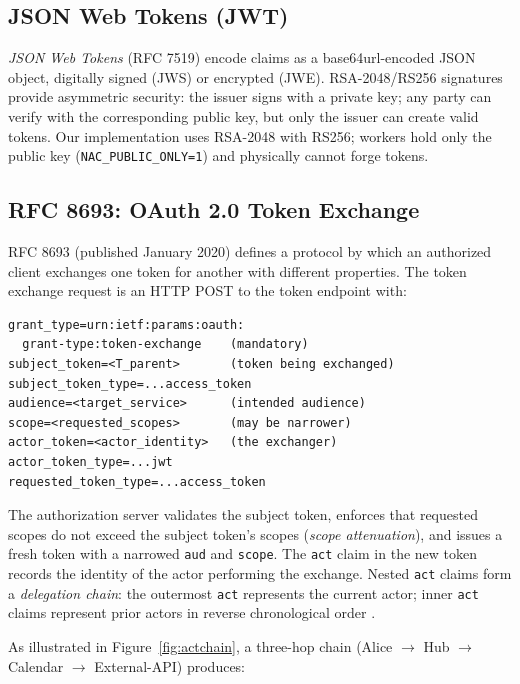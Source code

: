 \documentclass[journal]{IEEEtran}
\begin{document}
\subsection{JSON Web Tokens (JWT)}

\textit{JSON Web Tokens} (RFC 7519) \cite{rfc7519} encode claims as a base64url-encoded JSON object, digitally signed (JWS) or encrypted (JWE). RSA-2048/RS256 signatures provide asymmetric security: the issuer signs with a private key; any party can verify with the corresponding public key, but only the issuer can create valid tokens. Our implementation uses RSA-2048 with RS256; workers hold only the public key (\texttt{NAC\_PUBLIC\_ONLY=1}) and physically cannot forge tokens.

\subsection{RFC 8693: OAuth 2.0 Token Exchange}

RFC 8693 \cite{rfc8693} (published January 2020) defines a protocol by which an authorized client exchanges one token for another with different properties. The token exchange request is an HTTP POST to the token endpoint with:

\begin{lstlisting}[language={},caption={RFC 8693 token exchange request parameters}]
grant_type=urn:ietf:params:oauth:
  grant-type:token-exchange    (mandatory)
subject_token=<T_parent>       (token being exchanged)
subject_token_type=...access_token
audience=<target_service>      (intended audience)
scope=<requested_scopes>       (may be narrower)
actor_token=<actor_identity>   (the exchanger)
actor_token_type=...jwt
requested_token_type=...access_token
\end{lstlisting}

The authorization server validates the subject token, enforces that requested scopes do not exceed the subject token's scopes (\textit{scope attenuation}), and issues a fresh token with a narrowed \texttt{aud} and \texttt{scope}. The \texttt{act} claim in the new token records the identity of the actor performing the exchange. Nested \texttt{act} claims form a \textit{delegation chain}: the outermost \texttt{act} represents the current actor; inner \texttt{act} claims represent prior actors in reverse chronological order \cite{rfc8693}.

As illustrated in Figure~\ref{fig:actchain}, a three-hop chain (Alice $\to$ Hub $\to$ Calendar $\to$ External-API) produces:
\end{document}

